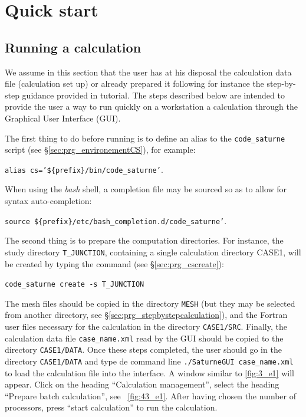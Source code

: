 \section{Quick start}
\subsection{Running a calculation}
We assume in this section that the user has at his disposal the calculation data file (calculation set up) or already prepared it following for instance the step-by-step guidance provided in \CS tutorial. The steps described below are intended to provide the user a way to run quickly on a workstation a calculation through the Graphical User Interface (GUI).

The first thing to do before running \CS is to define an alias to the \texttt{code\_saturne} script
(see \S\ref{sec:prg_environementCS}), for example:
\begin{center}
\texttt{alias cs='\$\{prefix\}/bin/code\_saturne'}.
\end{center}
When using the \emph{bash} shell, a completion file may be sourced so as to
allow for syntax auto-completion: 
\begin{center}
\texttt{source \$\{prefix\}/etc/bash\_completion.d/code\_saturne'}.
\end{center}
The second thing is to prepare the computation directories. For instance, the study directory \texttt{T\_JUNCTION}, containing a single calculation directory CASE1, will be created by typing the command (see \S\ref{sec:prg_cscreate}):\
\begin{center}
\texttt{code\_saturne create -s T\_JUNCTION}\
\end{center}
The mesh files should be copied in the directory \texttt{MESH} (but they may be selected from another directory, see \S\ref{sec:prg_stepbystepcalculation}), and the Fortran user files necessary for the calculation in the directory \texttt{CASE1/SRC}.  Finally, the calculation data file \texttt{case\_name.xml} read by the GUI should be copied to the directory \texttt{CASE1/DATA}.
Once these steps completed, the user should go in the directory \texttt{CASE1/DATA} and type de command line \texttt{./SaturneGUI case\_name.xml} to load the calculation file into the interface. A window similar to \figurename\ref{fig:3_e1} will appear. Click on the heading ``Calculation management'', select the heading ``Prepare batch calculation'', see \figurename~\ref{fig:43_e1}. After having chosen the number of processors, press ``start calculation'' to run the calculation.

